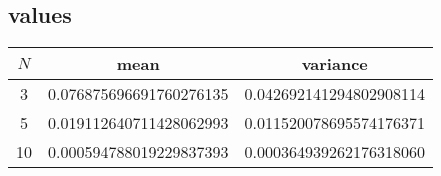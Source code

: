 \documentclass[11pt]{article}
\begin{document}
\subsection{values}
\begin{table}[H]
\centering
\begin{tabular}{c|c|c}
$N$ & mean & variance \\ \hline
3  & 0.076875696691760276135 & 0.042692141294802908114\\
5  & 0.019112640711428062993 & 0.011520078695574176371\\
10 & 0.000594788019229837393 & 0.000364939262176318060\\
\end{tabular}
\end{table}
\end{document}
